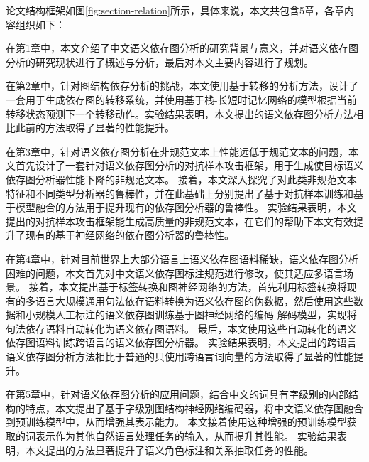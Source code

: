论文结构框架如图\ref{fig:section-relation}所示，具体来说，本文共包含5章，各章内容组织如下：

在第1章中，本文介绍了中文语义依存图分析的研究背景与意义，并对语义依存图分析的研究现状进行了概述与分析，最后对本文主要内容进行了规划。

在第2章中，针对图结构依存分析的挑战，本文使用基于转移的分析方法，设计了一套用于生成依存图的转移系统，并使用基于栈-长短时记忆网络的模型根据当前转移状态预测下一个转移动作。实验结果表明，本文提出的语义依存图分析方法相比此前的方法取得了显著的性能提升。

在第3章中，针对语义依存图分析在非规范文本上性能远低于规范文本的问题，本文首先设计了一套针对语义依存图分析的对抗样本攻击框架，用于生成使目标语义依存图分析器性能下降的非规范文本。
接着，本文深入探究了对此类非规范文本特征和不同类型分析器的鲁棒性，并在此基础上分别提出了基于对抗样本训练和基于模型融合的方法用于提升现有的依存图分析器的鲁棒性。
实验结果表明，本文提出的对抗样本攻击框架能生成高质量的非规范文本，在它们的帮助下本文有效提升了现有的基于神经网络的依存图分析器的鲁棒性。

在第4章中，针对目前世界上大部分语言上语义依存图语料稀缺，语义依存图分析困难的问题，本文首先对中文语义依存图标注规范进行修改，使其适应多语言场景。
接着，本文提出基于标签转换和图神经网络的方法，首先利用标签转换将现有的多语言大规模通用句法依存语料转换为语义依存图的伪数据，然后使用这些数据和小规模人工标注的语义依存图训练基于图神经网络的编码-解码模型，实现将句法依存语料自动转化为语义依存图语料。
最后，本文使用这些自动转化的语义依存图语料训练跨语言的语义依存图分析器。
实验结果表明，本文提出的跨语言语义依存图分析方法相比于普通的只使用跨语言词向量的方法取得了显著的性能提升。

在第5章中，针对语义依存图分析的应用问题，结合中文的词具有字级别的内部结构的特点，本文提出了基于字级别图结构神经网络编码器，将中文语义依存图融合到预训练模型中，从而增强其表示能力。
本文接着使用这种增强的预训练模型获取的词表示作为其他自然语言处理任务的输入，从而提升其性能。
实验结果表明，本文提出的方法显著提升了语义角色标注和关系抽取任务的性能。

